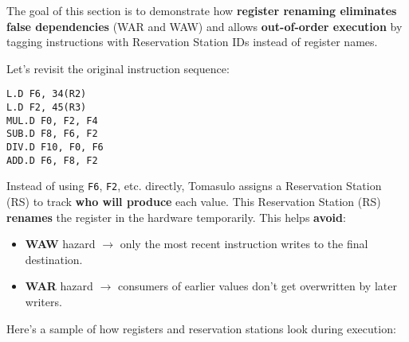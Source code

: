 \begin{examplebox}
    The goal of this section is to demonstrate how \textbf{register renaming eliminates false dependencies} (WAR and WAW) and allows \textbf{out-of-order execution} by tagging instructions with Reservation Station IDs instead of register names.

    \highspace
    Let's revisit the original instruction sequence:
    \begin{lstlisting}[language=unknown]
L.D F6, 34(R2)
L.D F2, 45(R3)
MUL.D F0, F2, F4
SUB.D F8, F6, F2
DIV.D F10, F0, F6
ADD.D F6, F8, F2\end{lstlisting}
    Instead of using \texttt{F6}, \texttt{F2}, etc. directly, Tomasulo assigns a Reservation Station (RS) to track \textbf{who will produce} each value. This Reservation Station (RS) \textbf{renames} the register in the hardware temporarily. This helps \textbf{avoid}:
    \begin{itemize}
        \item[\textcolor{Green3}{\faIcon{check-circle}}] \textbf{WAW} hazard $\rightarrow$ only the most recent instruction writes to the final destination.
        \item[\textcolor{Green3}{\faIcon{check-circle}}] \textbf{WAR} hazard $\rightarrow$ consumers of earlier values don't get overwritten by later writers.
    \end{itemize}
    Here's a sample of how registers and reservation stations look during execution:


\end{examplebox}
